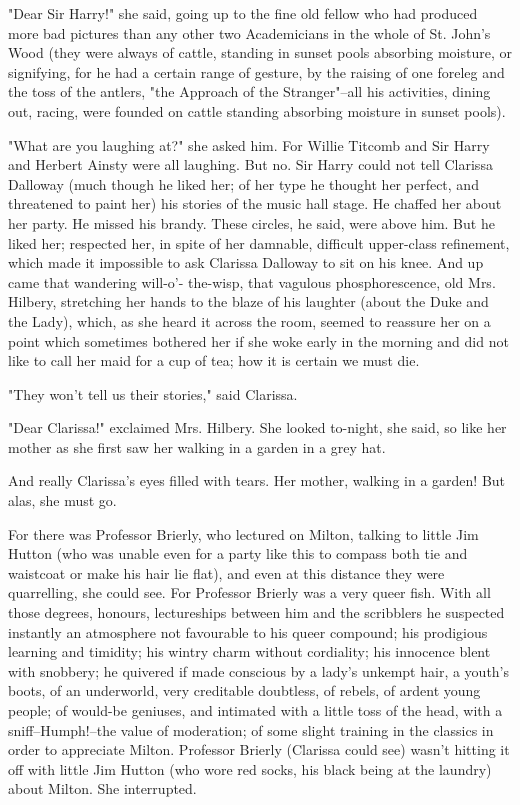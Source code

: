 \documentclass[lang=cn,10pt]{elegantbook}
\begin{document}
"Dear Sir Harry!" she said, going up to the fine old fellow who had
produced more bad pictures than any other two Academicians in the
whole of St. John's Wood (they were always of cattle, standing in
sunset pools absorbing moisture, or signifying, for he had a
certain range of gesture, by the raising of one foreleg and the
toss of the antlers, "the Approach of the Stranger"--all his
activities, dining out, racing, were founded on cattle standing
absorbing moisture in sunset pools).

"What are you laughing at?" she asked him.  For Willie Titcomb and
Sir Harry and Herbert Ainsty were all laughing.  But no.  Sir Harry
could not tell Clarissa Dalloway (much though he liked her; of her
type he thought her perfect, and threatened to paint her) his
stories of the music hall stage.  He chaffed her about her party.
He missed his brandy.  These circles, he said, were above him.  But
he liked her; respected her, in spite of her damnable, difficult
upper-class refinement, which made it impossible to ask Clarissa
Dalloway to sit on his knee.  And up came that wandering will-o'-
the-wisp, that vagulous phosphorescence, old Mrs. Hilbery,
stretching her hands to the blaze of his laughter (about the Duke
and the Lady), which, as she heard it across the room, seemed to
reassure her on a point which sometimes bothered her if she woke
early in the morning and did not like to call her maid for a cup of
tea; how it is certain we must die.

"They won't tell us their stories," said Clarissa.

"Dear Clarissa!" exclaimed Mrs. Hilbery.  She looked to-night, she
said, so like her mother as she first saw her walking in a garden
in a grey hat.

And really Clarissa's eyes filled with tears.  Her mother, walking
in a garden!  But alas, she must go.

For there was Professor Brierly, who lectured on Milton, talking to
little Jim Hutton (who was unable even for a party like this to
compass both tie and waistcoat or make his hair lie flat), and even
at this distance they were quarrelling, she could see.  For
Professor Brierly was a very queer fish.  With all those degrees,
honours, lectureships between him and the scribblers he suspected
instantly an atmosphere not favourable to his queer compound; his
prodigious learning and timidity; his wintry charm without
cordiality; his innocence blent with snobbery; he quivered if made
conscious by a lady's unkempt hair, a youth's boots, of an
underworld, very creditable doubtless, of rebels, of ardent young
people; of would-be geniuses, and intimated with a little toss of
the head, with a sniff--Humph!--the value of moderation; of some
slight training in the classics in order to appreciate Milton.
Professor Brierly (Clarissa could see) wasn't hitting it off with
little Jim Hutton (who wore red socks, his black being at the
laundry) about Milton.  She interrupted.
\end{document}

